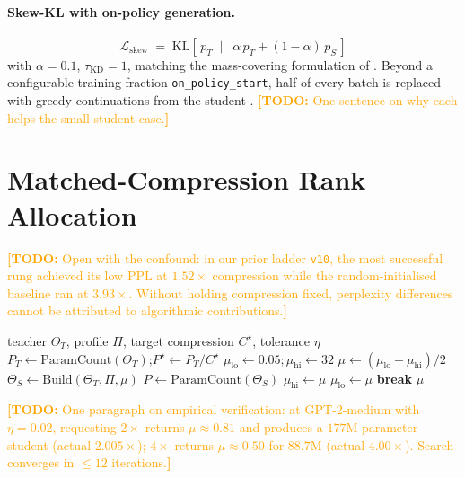 \documentclass{article}
\newcommand{\todo}[1]{\textcolor{orange}{\textbf{[TODO:} #1\textbf{]}}}
\newcommand{\KL}{\mathrm{KL}}
\begin{document}
\paragraph{Skew-KL with on-policy generation.}
\begin{equation}
\label{eq:skewkl}
\mathcal{L}_{\mathrm{skew}} \;=\; \KL\!\left[\, p_T \;\big\|\; \alpha\, p_T + (1 - \alpha)\, p_S \,\right]
\end{equation}
with $\alpha = 0.1$, $\tau_{\mathrm{KD}} = 1$, matching the mass-covering
formulation of \citet{Ko2024DistiLLM}. Beyond a configurable training
fraction \texttt{on\_policy\_start}, half of every batch is replaced
with greedy continuations from the student
\citep{Agarwal2024GKD}. \todo{One sentence on why each helps the small-student case.}

\section{Matched-Compression Rank Allocation}
\label{sec:matched}
\todo{Open with the confound: in our prior ladder \texttt{v10}, the most
successful rung achieved its low PPL at $1.52\times$ compression while the
random-initialised baseline ran at $3.93\times$. Without holding compression
fixed, perplexity differences cannot be attributed to algorithmic
contributions.}

\begin{algorithm}[t]
\caption{Matched-compression \texttt{arch\_multiplier} search.}
\label{alg:matched}
\begin{algorithmic}[1]
\Require teacher $\Theta_T$, profile $\Pi$, target compression $C^\star$, tolerance $\eta$
\State $P_T \gets \mathrm{ParamCount}(\Theta_T)$;\quad $P^\star \gets P_T / C^\star$
\State $\mu_{\mathrm{lo}} \gets 0.05; \mu_{\mathrm{hi}} \gets 32$
  \State $\mu \gets (\mu_{\mathrm{lo}} + \mu_{\mathrm{hi}})/2$
  \State $\Theta_S \gets \mathrm{Build}(\Theta_T, \Pi, \mu)$
  \State $P \gets \mathrm{ParamCount}(\Theta_S)$
   $\mu_{\mathrm{hi}} \gets \mu$ \Else{} $\mu_{\mathrm{lo}} \gets \mu$ \EndIf
   \textbf{break} \EndIf
\EndFor
\State \Return $\mu$
\end{algorithmic}
\end{algorithm}

\todo{One paragraph on empirical verification: at GPT-2-medium with
$\eta = 0.02$, requesting $2\times$ returns $\mu \approx 0.81$ and produces
a $177$M-parameter student (actual $2.005\times$); $4\times$ returns
$\mu \approx 0.50$ for $88.7$M (actual $4.00\times$). Search converges in
$\le 12$ iterations.}
\end{document}
